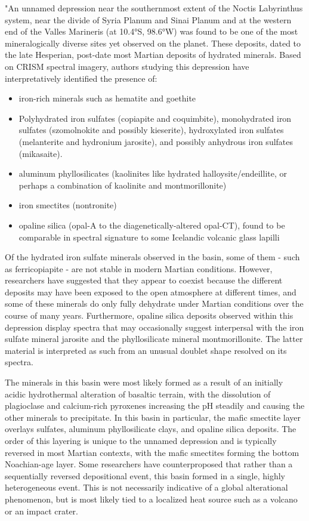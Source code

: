 \documentclass[a4paper,10pt,openany,oneside]{memoir}
\begin{document}
"An unnamed depression near the southernmost extent of the Noctis Labyrinthus system, near the divide of Syria Planum and Sinai Planum and at the western end of the Valles Marineris (at 10.4°S, 98.6°W) was found to be one of the most mineralogically diverse sites yet observed on the planet. These deposits, dated to the late Hesperian, post-date most Martian deposits of hydrated minerals. Based on CRISM spectral imagery, authors studying this depression have interpretatively identified the presence of:

\begin{itemize}
\item iron-rich minerals such as hematite and goethite
\item Polyhydrated iron sulfates (copiapite and coquimbite), monohydrated iron sulfates (szomolnokite and possibly kieserite), hydroxylated iron sulfates (melanterite and hydronium jarosite), and possibly anhydrous iron sulfates (mikasaite).
\item aluminum phyllosilicates (kaolinites like hydrated halloysite/endeillite, or perhaps a combination of kaolinite and montmorillonite)
\item iron smectites (nontronite)
\item opaline silica (opal-A to the diagenetically-altered opal-CT), found to be comparable in spectral signature to some Icelandic volcanic glass lapilli
\end{itemize}

Of the hydrated iron sulfate minerals observed in the basin, some of them - such as ferricopiapite - are not stable in modern Martian conditions. However, researchers have suggested that they appear to coexist because the different deposits may have been exposed to the open atmosphere at different times, and some of these minerals do only fully dehydrate under Martian conditions over the course of many years. Furthermore, opaline silica deposits observed within this depression display spectra that may occasionally suggest interpersal with the iron sulfate mineral jarosite and the phyllosilicate mineral montmorillonite. The latter material is interpreted as such from an unusual doublet shape resolved on its spectra.

The minerals in this basin were most likely formed as a result of an initially acidic hydrothermal alteration of basaltic terrain, with the dissolution of plagioclase and calcium-rich pyroxenes increasing the pH steadily and causing the other minerals to precipitate. In this basin in particular, the mafic smectite layer overlays sulfates, aluminum phyllosilicate clays, and opaline silica deposits. The order of this layering is unique to the unnamed depression and is typically reversed in most Martian contexts, with the mafic smectites forming the bottom Noachian-age layer. Some researchers have counterproposed that rather than a sequentially reversed depositional event, this basin formed in a single, highly heterogeneous event. This is not necessarily indicative of a global alterational phenomenon, but is most likely tied to a localized heat source such as a volcano or an impact crater.
\end{document}
